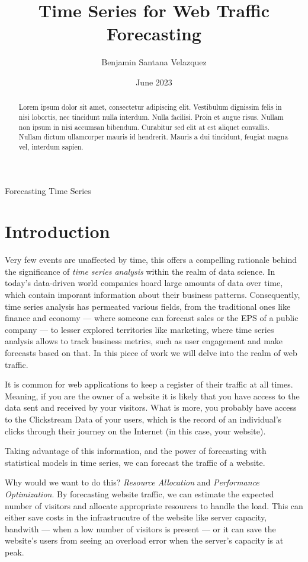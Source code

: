 \documentclass[journal]{IEEEtran}
\title{Time Series for Web Traffic Forecasting }
\author{Benjamin Santana Velazquez}
\date{June 2023}
\begin{document}
\maketitle

\begin{abstract}
    Lorem ipsum dolor sit amet, consectetur adipiscing elit. Vestibulum
    dignissim felis in nisi lobortis, nec tincidunt nulla interdum. Nulla
    facilisi. Proin et augue risus. Nullam non ipsum in nisi accumsan bibendum.
    Curabitur sed elit at est aliquet convallis. Nullam dictum ullamcorper
    mauris id hendrerit. Mauris a dui tincidunt, feugiat magna vel, interdum
    sapien.
\end{abstract}

\begin{IEEEkeywords}
    Forecasting
    Time Series
\end{IEEEkeywords}

\section{Introduction}
Very few events are unaffected by time, this offers a compelling rationale
behind the significance of \emph{time series analysis} within the
realm of data science. In today's data-driven world companies hoard large
amounts of data over time, which contain imporant information about their
business patterns. Consequently, time series analysis has permeated various
fields, from the traditional ones like finance and economy --- where someone
can forecast sales or the EPS of a public company --- to lesser explored
territories like marketing, where time series analysis allows to track business
metrics, such as user engagement and make forecasts based on that. In this
piece of work we will delve into the realm of web traffic.

It is common for web applications to keep a register of their traffic at all
times. Meaning, if you are the owner of a website it is likely that you have
access to the data sent and received by your visitors. What is more, you
probably have access to the Clickstream Data of your users, which is the record
of an individual’s clicks through their journey on the Internet (in this case,
your website).

Taking advantage of this information, and the power of forecasting with
statistical models in time series, we can forecast the traffic of a website.

Why would we want to do this? \emph{Resource Allocation} and \emph{Performance
Optimization}. By forecasting website traffic, we can estimate the expected
number of visitors and allocate appropriate resources to handle the load. This
can either save costs in the infrastrucutre of the website like server
capacity, bandwith --- when a low number of visitors is present --- or it can
save the website's users from seeing an overload error when the server's
capacity is at peak.
\end{document}
